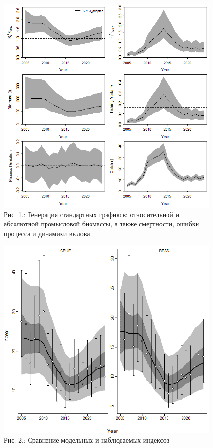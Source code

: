\documentclass[
  letterpaper,
  DIV=11,
  numbers=noendperiod]{scrreprt}
\begin{document}
\begin{figure}[H]

{\centering \includegraphics[width=0.8\linewidth,height=\textheight,keepaspectratio]{images/JABBA1.PNG}

}

\caption{Рис. 1.: Генерация стандартных графиков: относительной и
абсолютной промысловой биомассы, а также смертности, ошибки процесса и
динамики вылова.}

\end{figure}%

\begin{figure}[H]

{\centering \includegraphics[width=0.6\linewidth,height=\textheight,keepaspectratio]{images/JABBA2.PNG}

}

\caption{Рис. 2.: Сравнение модельных и наблюдаемых индексов}

\end{figure}%
\end{document}
